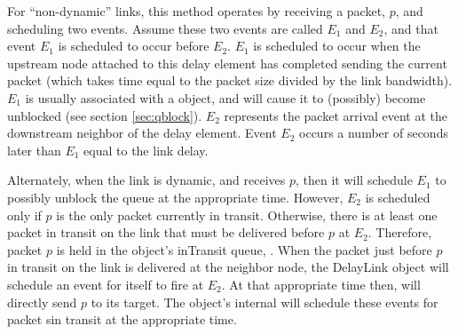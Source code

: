 For ``non-dynamic'' links,
this method operates by receiving a packet, $p$,  and scheduling two
events.
Assume these two events are called $E_1$ and $E_2$, and that
event $E_1$ is scheduled to occur before $E_2$.
$E_1$ is scheduled to occur when the upstream node attached to this
delay element has completed sending the current packet
(which takes time equal to the packet size divided by the link bandwidth).
$E_1$ is usually associated with a  object, and will
cause it to (possibly) become unblocked (see section \ref{sec:qblock}).
$E_2$ represents the packet arrival event at the downstream neighbor
of the delay element.
Event $E_2$ occurs a number of seconds later than $E_1$ equal to the
link delay.

Alternately, when the link is dynamic, and receives  $p$, then
it will schedule $E_1$ to possibly unblock the queue at the
appropriate time.
However, $E_2$ is scheduled only
if $p$ is the only packet currently in transit.
Otherwise, there is at least one packet in transit on the link that must
be delivered before $p$ at $E_2$.
Therefore, packet $p$ is held in the object's inTransit queue, .
When the packet just before $p$ in transit on the link is delivered
at the neighbor node, 
the DelayLink object will schedule an event for itself to fire at $E_2$.
At that appropriate time then, 
will directly send $p$ to its target.
The object's internal
will schedule these events for packet sin transit at the appropriate time.



